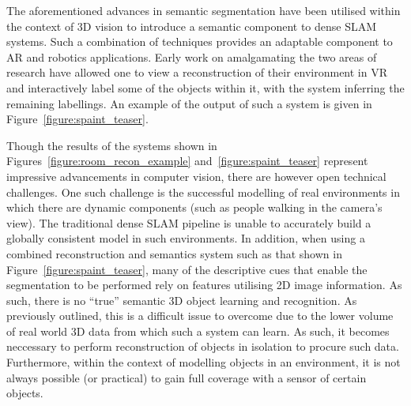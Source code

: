 The aforementioned advances in semantic segmentation have been utilised within the context of 3D vision to 
introduce a semantic component to dense SLAM systems. Such a combination of techniques provides an adaptable 
component to AR and robotics applications. Early work on amalgamating the two areas of research have allowed 
one to view a reconstruction of their environment in VR and interactively label some of the objects within 
it, with the system inferring the remaining labellings. An example of the output of such a system is given 
in Figure~\ref{figure:spaint_teaser}.

Though the results of the systems shown in Figures~\ref{figure:room_recon_example} and~\ref{figure:spaint_teaser} 
represent impressive advancements in computer vision, there are however open technical challenges. One such 
challenge is the successful modelling of real environments in which there are dynamic components (such as 
people walking in the camera's view). The traditional dense SLAM pipeline is unable to accurately build a 
globally consistent model in such environments. In addition, when using a combined reconstruction and 
semantics system such as that shown in Figure~\ref{figure:spaint_teaser}, many of the descriptive cues that 
enable the segmentation to be performed rely on features utilising 2D image information. As such, there is 
no ``true'' semantic 3D object learning and recognition. As previously outlined, this is a difficult issue 
to overcome due to the lower volume of real world 3D data from which such a system can learn. As such, it 
becomes neccessary to perform reconstruction of objects in isolation to procure such data. Furthermore, 
within the context of modelling objects in an environment, it is not always possible (or practical) to gain 
full coverage with a sensor of certain objects.

